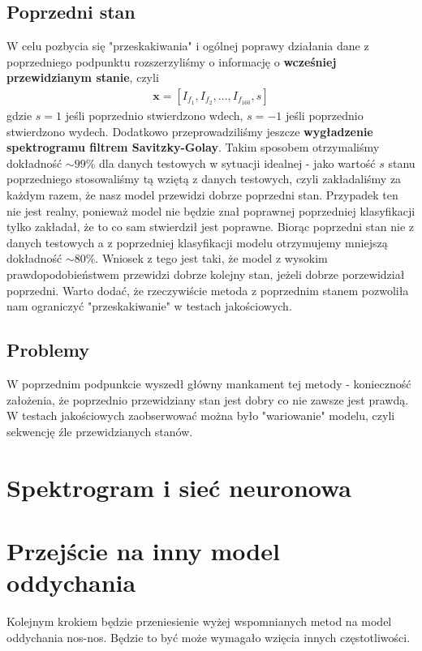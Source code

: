 \documentclass[polish]{article}
\begin{document}
\subsection{Poprzedni stan}
W celu pozbycia się "przeskakiwania" i ogólnej poprawy działania dane z poprzedniego podpunktu rozszerzyliśmy o informację o \textbf{wcześniej przewidzianym stanie}, czyli 
\begin{gather*}
	\boldsymbol{x} = [I_{f_1}, I_{f_2}, ..., I_{f_160},  s]
\end{gather*}
 gdzie $s = 1$ jeśli poprzednio stwierdzono wdech, $s=-1$ jeśli poprzednio stwierdzono wydech.
Dodatkowo przeprowadziliśmy jeszcze \textbf{wygładzenie spektrogramu filtrem Savitzky-Golay}.
Takim sposobem otrzymaliśmy dokładność $\sim 99\%$ dla danych testowych w sytuacji idealnej - jako wartość $s$ stanu poprzedniego stosowaliśmy tą wziętą z
danych testowych, czyli zakładaliśmy za każdym razem, że nasz model przewidzi dobrze poprzedni stan.
Przypadek ten nie jest realny, ponieważ model nie będzie znał poprawnej poprzedniej klasyfikacji tylko 
zakładał, że to co sam stwierdził jest poprawne.  Biorąc poprzedni stan nie z danych testowych a z poprzedniej
klasyfikacji modelu otrzymujemy mniejszą dokładność $\sim 80\%$. Wniosek z tego jest taki, że model
z wysokim prawdopodobieństwem przewidzi dobrze kolejny stan, jeżeli dobrze porzewidział poprzedni. 
Warto dodać, że rzeczywiście metoda z poprzednim stanem pozwoliła nam ograniczyć "przeskakiwanie" 
w testach jakościowych.
\subsection{Problemy}
W poprzednim podpunkcie wyszedł główny mankament tej metody - konieczność założenia, że poprzednio
przewidziany stan jest dobry co nie zawsze jest prawdą. W testach jakościowych zaobserwować można było
"wariowanie" modelu, czyli sekwencję źle przewidzianych stanów.

\section{Spektrogram i sieć neuronowa}

\section{Przejście na inny model oddychania}
Kolejnym krokiem będzie przeniesienie wyżej wspomnianych metod na model oddychania nos-nos. 
Będzie to być może wymagało wzięcia innych częstotliwości.
\end{document}
